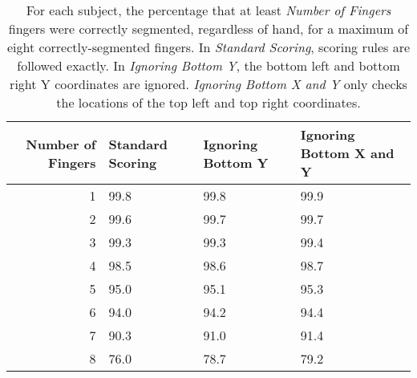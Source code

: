 \documentclass[]{article}
\begin{document}
\begin{table}[!h]

\caption{\label{tab:twoinch-per-subject}For each subject, the percentage that at least \textit{Number of Fingers} fingers were correctly segmented, regardless of hand, for a maximum of eight correctly-segmented fingers. In \textit{Standard Scoring}, scoring rules are followed exactly. In \textit{Ignoring Bottom Y}, the bottom left and bottom right Y coordinates are ignored. \textit{Ignoring Bottom X and Y} only checks the locations of the top left and top right coordinates.}
\centering
\begin{tabular}{rlll}
\toprule
Number of Fingers & Standard Scoring & Ignoring Bottom Y & Ignoring Bottom X and Y\\
\midrule
\rowcolor{gray!6}  1 & 99.8 & 99.8 & 99.9\\
2 & 99.6 & 99.7 & 99.7\\
\rowcolor{gray!6}  3 & 99.3 & 99.3 & 99.4\\
4 & 98.5 & 98.6 & 98.7\\
\rowcolor{gray!6}  5 & 95.0 & 95.1 & 95.3\\
6 & 94.0 & 94.2 & 94.4\\
\rowcolor{gray!6}  7 & 90.3 & 91.0 & 91.4\\
8 & 76.0 & 78.7 & 79.2\\
\bottomrule
\end{tabular}
\end{table}
\end{document}
